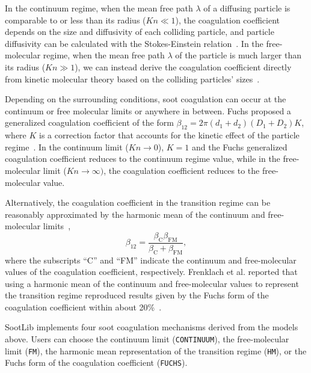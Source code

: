 \documentclass[preprint,letterpaper]{elsarticle}
\begin{document}
In the continuum regime, when the mean free path $\lambda$ of a diffusing particle is comparable to or less than its radius ($Kn\ll1$), the coagulation coefficient depends on the size and diffusivity of each colliding particle, and particle diffusivity can be calculated with the Stokes-Einstein relation~\cite{Seinfeld_2016}.
In the free-molecular regime, when the mean free path $\lambda$ of the particle is much larger than its radius ($Kn\gg1$), we can instead derive the coagulation coefficient directly from kinetic molecular theory based on the colliding particles' sizes~\cite{Seinfeld_2016}.

Depending on the surrounding conditions, soot coagulation can occur at the continuum or free molecular limits or anywhere in between. Fuchs proposed a generalized coagulation coefficient of the form $\beta_{12}=2\pi (d_{1}+d_{2})(D_1+D_2)K$, where $K$ is a correction factor that accounts for the kinetic effect of the particle regime~\cite{Fuchs_1964, Seinfeld_2016}.
In the continuum limit ($Kn \rightarrow 0$), $K=1$ and the Fuchs generalized coagulation coefficient reduces to the continuum regime value, while in the free-molecular limit ($Kn \rightarrow \infty)$, the coagulation coefficient reduces to the free-molecular value.

Alternatively, the coagulation coefficient in the transition regime can be reasonably approximated by the harmonic mean of the continuum and free-molecular limits~\cite{Kazakov_1998,Frenklach_2002b},
\begin{equation} \label{e:soot-coag-hm}
\beta_{12} = \frac{\beta_{\text{C}}\beta_{\text{FM}}}{\beta_{\text{C}} + \beta_{\text{FM}}},
\end{equation}
where the subscripts ``C'' and ``FM'' indicate the continuum and free-molecular values of the coagulation coefficient, respectively. Frenklach et al. reported that using a harmonic mean of the continuum and free-molecular values to represent the transition regime reproduced results given by the Fuchs form of the coagulation coefficient within about 20\%~\cite{Frenklach_2002b}.

SootLib implements four soot coagulation mechanisms derived from the models above. Users can choose the continuum limit (\texttt{CONTINUUM}), the free-molecular limit (\texttt{FM}), the harmonic mean representation of the transition regime (\texttt{HM}), or the Fuchs form of the coagulation coefficient (\texttt{FUCHS}).

\end{document}

